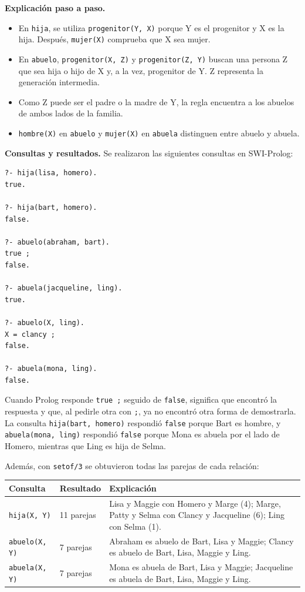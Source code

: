 \documentclass[12pt,letterpaper]{article}
\begin{document}
\noindent\textbf{Explicación paso a paso.}
\begin{itemize}
  \item En \texttt{hija}, se utiliza \texttt{progenitor(Y, X)} porque Y es el
  progenitor y X es la hija. Después, \texttt{mujer(X)} comprueba que X sea mujer.
  \item En \texttt{abuelo}, \texttt{progenitor(X, Z)} y \texttt{progenitor(Z, Y)}
  buscan una persona Z que sea hija o hijo de X y, a la vez, progenitor de Y. Z
  representa la generación intermedia.
  \item Como Z puede ser el padre o la madre de Y, la regla encuentra a los abuelos
  de ambos lados de la familia.
  \item \texttt{hombre(X)} en \texttt{abuelo} y \texttt{mujer(X)} en
  \texttt{abuela} distinguen entre abuelo y abuela.
\end{itemize}

\noindent\textbf{Consultas y resultados.} Se realizaron las siguientes consultas en
SWI-Prolog:

\begin{lstlisting}
?- hija(lisa, homero).
true.

?- hija(bart, homero).
false.

?- abuelo(abraham, bart).
true ;
false.

?- abuela(jacqueline, ling).
true.

?- abuelo(X, ling).
X = clancy ;
false.

?- abuela(mona, ling).
false.
\end{lstlisting}

Cuando Prolog responde \texttt{true ;} seguido de \texttt{false}, significa que
encontró la respuesta y que, al pedirle otra con \texttt{;}, ya no encontró otra
forma de demostrarla. La consulta \texttt{hija(bart, homero)} respondió
\texttt{false} porque Bart es hombre, y \texttt{abuela(mona, ling)} respondió
\texttt{false} porque Mona es abuela por el lado de Homero, mientras que Ling es
hija de Selma.

Además, con \texttt{setof/3} se obtuvieron todas las parejas de cada relación:

\begin{center}
\begin{tabular}{|p{4cm}|p{2.2cm}|p{6cm}|}
\hline
\textbf{Consulta} & \textbf{Resultado} & \textbf{Explicación} \\
\hline
\texttt{hija(X, Y)} & 11 parejas & Lisa y Maggie con Homero y Marge (4); Marge,
Patty y Selma con Clancy y Jacqueline (6); Ling con Selma (1). \\
\hline
\texttt{abuelo(X, Y)} & 7 parejas & Abraham es abuelo de Bart, Lisa y Maggie;
Clancy es abuelo de Bart, Lisa, Maggie y Ling. \\
\hline
\texttt{abuela(X, Y)} & 7 parejas & Mona es abuela de Bart, Lisa y Maggie;
Jacqueline es abuela de Bart, Lisa, Maggie y Ling. \\
\hline
\end{tabular}
\end{center}
\end{document}
